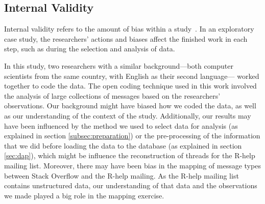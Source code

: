 \documentclass{sig-alternate-05-2015}
\begin{document}
%

\subsection{Internal Validity}

	Internal validity refers to the amount of bias within a study~\cite{Creswell2009}. 
	In an exploratory case study, the researchers' actions and biases affect the finished work in each step,  
	such as during the selection and analysis of data. 

	In this study, two researchers with a similar background---both computer scientists from the same country, with English as their second language---	worked together to code the data. 
	The open coding technique used in this work involved the analysis of large collections of messages based on the researchers' observations. 
	Our background might have biased how we coded the data, as well as our understanding of the context of the study. 
	Additionally, our results may have been influenced by the method we used to select data for analysis (as explained in section \ref{subsec:preparation}) or the pre-processing of the information that we did before loading the data to the database (as explained in section \ref{sec:dap}), which might be influence the reconstruction of threads for the R-help mailing list. 
	Moreover, there may have been bias in the mapping of message types between Stack Overflow and the R-help mailing. As the R-help mailing list contains unstructured data, our understanding of that data and the observations we made played a big role in the mapping exercise. 
\end{document}
